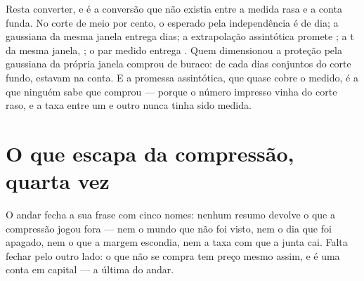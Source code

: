 Resta converter, e é a conversão que não existia entre a medida rasa e a conta funda. No corte de
meio por cento, o esperado pela independência é \numFundoPrecoEsperado{} de dia; a gaussiana da
mesma janela entrega \numFundoPrecoGaussJanela{} dias; a extrapolação assintótica promete
\numFundoPrecoAssintotico; a t da mesma janela, \numFundoPrecoTJanela; o par medido entrega
\numFundoPrecoMedidos. Quem dimensionou a proteção pela gaussiana da própria janela comprou
\numFundoPrecoDescoberto{} de buraco: de cada \numFundoPrecoMedidos{} dias conjuntos do corte fundo,
\numFundoPrecoGaussJanela{} estavam na conta. E a promessa assintótica, que quase cobre o medido, é
a que ninguém sabe que comprou --- porque o número impresso vinha do corte raso, e a taxa entre um e
outro nunca tinha sido medida.

\section{O que escapa da compressão, quarta vez}

O andar fecha a sua frase com cinco nomes: nenhum resumo devolve o que a compressão jogou fora ---
nem o mundo que não foi visto, nem o dia que foi apagado, nem o que a margem escondia, nem a taxa com que a
junta cai. Falta fechar pelo outro lado: o que não se compra tem preço mesmo assim, e é uma conta em
capital --- a última do andar.